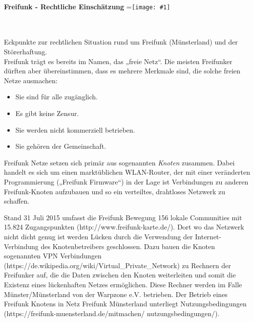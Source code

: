 \documentclass{article}
\begin{document}
\pagestyle{fancy}
\renewcommand{\headrulewidth}{0pt}
\fancyhf{
\fancyhead[LE,RO]{\color[rgb]{0.8627,0,0.4039}\noindent\makebox[\linewidth]{\rule{\paperwidth}{36pt}}}
\fancyfoot[LE,RO]{\color[rgb]{0.8627,0,0.4039}\noindent\makebox[\linewidth]{\rule{\paperwidth}{36pt}}}}
\newcommand{\vcenteredinclude}[1]{\begingroup
\setbox0=\hbox{\texttt{[image: \#1]}}%
\parbox{\wd0}{\box0}\endgroup}
\vspace{0.5cm}\ \\
	\textbf{\Huge
	Freifunk - Rechtliche Einschätzung} \hfill\vcenteredinclude{Vorlagen/logo-gt.png}\\
\vspace{0.5cm}\ \\

Eckpunkte zur rechtlichen Situation rund um Freifunk (Münsterland) und der Störerhaftung. \\
Freifunk trägt es bereits im Namen, das „freie Netz“. Die meisten Freifunker dürften aber übereinstimmen, dass es mehrere Merkmale sind, die solche freien Netze ausmachen:
\begin{itemize}
	\item Sie sind für alle zugänglich.
	\item Es gibt keine Zensur.
	\item Sie werden nicht kommerziell betrieben.
	\item Sie gehören der Gemeinschaft.
\end{itemize}

Freifunk Netze setzen sich primär aus sogenannten \emph{Knoten} zusammen. 
Dabei handelt es sich um einen marktüblichen WLAN-Router, der mit einer veränderten Programmierung („Freifunk Firmware“) in der Lage ist Verbindungen zu anderen Freifunk-Knoten aufzubauen und so ein verteiltes, drahtloses Netzwerk zu schaffen.

Stand 31 Juli 2015 umfasst die Freifunk Bewegung 156 lokale Communities mit 15.824 Zugangspunkten (http://www.freifunk-karte.de/). 
Dort wo das Netzwerk nicht dicht genug ist werden Lücken durch die Verwendung der Internet-Verbindung des Knotenbetreibers geschlossen. 
Dazu bauen die Knoten sogenannten VPN Verbindungen (https://de.wikipedia.org/wiki/Virtual\_Private\_Network) zu Rechnern der Freifunker auf, die die Daten zwischen den Knoten weiterleiten und somit die Existenz eines lückenhaften Netzes ermöglichen. Diese Rechner werden im Falle Münster/Münsterland von der Warpzone e.V. betrieben.  Der Betrieb eines Freifunk Knotens in Netz Freifunk Münsterland unterliegt Nutzungsbedingungen (https://freifunk-muensterland.de/mitmachen/ nutzungsbedingungen/).
\end{document}
